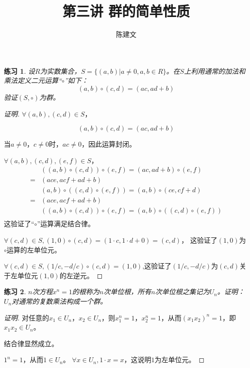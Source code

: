 \documentclass{article}
\newtheorem{Exercise}{练习}
\begin{document}
\begin{CJK*}{UTF8}{gbsn}
  \title{第三讲 群的简单性质}
  \author{陈建文}
  \maketitle
  
  \begin{Exercise}
    设$R$为实数集合，$S=\{(a,b)|a\neq 0,a,b\in R\}$。在$S$上利用通常的加法和乘法定义二元运算“$\circ$”如下：
    \[(a,b)\circ (c,d) = (ac, ad + b)\]
    验证$(S,\circ)$为群。
  \end{Exercise}
  \begin{proof}[证明]

    $\forall (a,b),(c,d)\in S$，

    \[(a,b)\circ (c,d) = (ac, ad + b)\]

    当$a\neq 0$，$c\neq 0$时，$ac\neq 0$，因此运算封闭。


    $\forall (a,b),(c,d),(e,f)\in S$，
    \begin{align*}
      &((a,b)\circ (c,d))\circ (e,f) = (ac,ad+b)\circ (e,f)\\
      =&(ace,acf+ad+b)\\
      &(a,b)\circ ((c,d)\circ (e,f)) = (a,b)\circ (ce,cf+d)\\
      =&(ace,acf+ad+b)\\
      &((a,b)\circ (c,d))\circ (e,f) = (a,b)\circ ((c,d)\circ (e,f))\\
    \end{align*}
    这验证了“$\circ$”运算满足结合律。
  
    $\forall (c,d)\in S, (1,0)\circ (c,d) = (1\cdot c, 1\cdot d + 0) = (c,d)$，
  这验证了$(1,0)$为$\circ$运算的左单位元。
  
  $\forall (c,d)\in S,(1/c,-d/c)\circ (c,d) = (1,0)$,这验证了$(1/c,-d/c)$为$(c,d)$关于左单位元$(1,0)$的左逆元。
  \end{proof}
  \begin{Exercise}
    $n$次方程$x^n=1$的根称为$n$次单位根，所有$n$次单位根之集记为$U_n$。证明：$U_n$对通常的复数乘法构成一个群。
  \end{Exercise}
  \begin{proof}[证明]
    对任意的$x_1\in U_n$，$x_2\in U_n$，则$x^n_1=1$，$x_2^n=1$，从而$(x_1x_2)^n=1$，即$x_1x_2\in U_n$。
  
    结合律显然成立。
  
    $1^n=1$，从而$1\in U_n$。 $\forall x\in U_n, 1\cdot x = x$，这说明$1$为左单位元。
  

\end{proof}
\end{CJK*}
\end{document}
